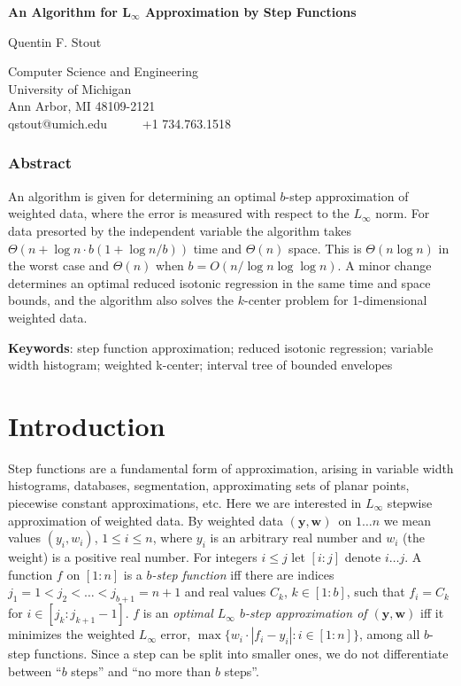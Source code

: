 \documentclass[11pt]{article}
\renewcommand{\vec}[1]{\ensuremath{\mathbf{#1}}}
\newcommand{\data}{\ensuremath{(\vec{y},\vec{w})}}
\newcommand{\inter}[2]{\ensuremath{[#1\!:\!#2]}}
\begin{document}
\begin{center}
\textbf{\Large An Algorithm for $\mathbf{L_\infty}$ Approximation by Step Functions}
\medskip

{\large Quentin F. Stout}
\smallskip

Computer Science and Engineering\\
University of Michigan\\
Ann Arbor, MI 48109-2121\\
qstout@umich.edu~~~~~ +1 734.763.1518
\end{center}
\vspace{-0.17in}

\subsubsection*{Abstract}
An algorithm is given for determining an optimal $b$-step approximation of weighted data, where the error is measured with respect to the $L_\infty$ norm.
For data presorted by the independent variable the algorithm takes $\Theta(n + \log n \cdot b(1+\log n/b))$ time and $\Theta(n)$ space.
This is $\Theta(n \log n)$ in the worst case and $\Theta(n)$ when $b = O(n/\log n \log\log n)$.
A minor change determines an optimal reduced isotonic regression in the same time and space bounds,
and the algorithm also solves the $k$-center problem for 1-dimensional weighted data.


\noindent
\textbf{Keywords}: step function approximation; reduced isotonic regression; variable width histogram; weighted k-center; interval tree of bounded envelopes



\vspace*{-0.055in}
\section{Introduction}
\vspace*{-0.055in}

Step functions are a fundamental form of approximation, arising in variable width histograms,
databases, segmentation,
approximating sets of planar points, piecewise constant approximations, etc.
Here we are interested in $L_\infty$ stepwise approximation of weighted data.
By weighted data \data\ on $1\ldots n$ we mean values $(y_i,w_i)$,
$1 \leq i \leq n$, where $y_i$ is an arbitrary real number and $w_i$ (the weight) is a positive real number.
For integers $i \leq j$ let \inter{i}{j} denote $i \ldots j$.
A function $f$ on \inter{1}{n} is a
\textit{$b$-step function} iff there are indices $j_1 = 1 < j_2 < \ldots < j_{b+1} =n+1$ and real values $C_k$, $k \in \inter{1}{b}$, such that $f_i = C_k$ for $i \in \inter{j_k}{j_{k+1}\!-\!1}$.
$f$ is an \textit{optimal $L_\infty$ $b$-step approximation of \data} iff it minimizes the weighted $L_\infty$ error, $\max\{w_i\cdot|f_i-y_i| : i\in\inter{1}{n}\}$, among all $b$-step functions.
Since a step can be split into smaller ones, we do not differentiate between ``$b$ steps'' and ``no more than $b$ steps''.
\end{document}
